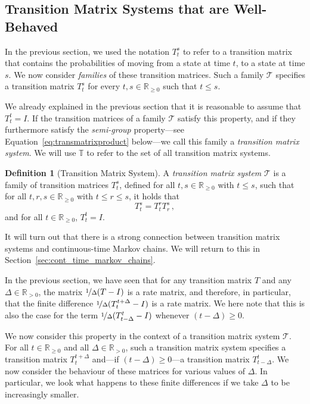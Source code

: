\documentclass[10pt,a4paper]{paper}
\theoremstyle{definition}
\newtheorem{definition}{Definition}
\newcommand{\reals}{\mathbb{R}}
\newcommand{\realspos}{\reals_{>0}}
\newcommand{\realsnonneg}{\reals_{\geq 0}}
\begin{document}
\subsection{Transition Matrix Systems that are Well-Behaved}

In the previous section, we used the notation $T_t^s$ to refer to a transition matrix that contains the probabilities of moving from a state at time $t$, to a state at time $s$. We now consider \emph{families} of these transition matrices. Such a family $\mathcal{T}$ specifies a transition matrix $T_t^s$ for every $t,s\in\realsnonneg$ such that $t\leq s$. 

We already explained in the previous section that it is reasonable to assume that $T_t^t=I$. If the transition matrices of a family $\mathcal{T}$ satisfy this property, and if they furthermore satisfy the \emph{semi-group} property---see Equation~\ref{eq:transmatrixproduct} below---we call this family a \emph{transition matrix system}. We will use $\mathbb{T}$ to refer to the set of all transition matrix systems.

\begin{definition}[Transition Matrix System]\label{def:trans_mat_system}
A \emph{transition matrix system} $\mathcal{T}$ is a family of transition matrices $T_t^s$, defined for all $t,s\in\realsnonneg$ with $t\leq s$, such that for all $t,r,s\in\realsnonneg$ with $t\leq r\leq s$, it holds that
\begin{equation}\label{eq:transmatrixproduct}
T_t^s=T_t^r T_r^s\,,
\end{equation}
and for all $t\in\realsnonneg$, $T_t^t=I$.
\end{definition}
It will turn out that there is a strong connection between transition matrix systems and continuous-time Markov chains. We will return to this in Section~\ref{sec:cont_time_markov_chains}.

In the previous section, we have seen that for any transition matrix $T$ and any $\Delta\in\realspos$, the matrix $\nicefrac{1}{\Delta}(T - I)$ is a rate matrix, and therefore, in particular, that the finite difference $\nicefrac{1}{\Delta}(T_t^{t+\Delta} - I)$ is a rate matrix. We here note that this is also the case for the term $\nicefrac{1}{\Delta}(T_{t-\Delta}^t - I)$ whenever $(t-\Delta)\geq0$.

We now consider this property in the context of a transition matrix system $\mathcal{T}$. For all $t\in\realsnonneg$ and all $\Delta\in\realspos$, such a transition matrix system specifies a transition matrix $T_t^{t+\Delta}$ and---if $(t-\Delta)\geq0$---a transition matrix $T_{t-\Delta}^t$. We now consider the behaviour of these matrices for various values of $\Delta$. In particular, we look what happens to these finite differences if we take $\Delta$ to be increasingly smaller. 
\end{document}
